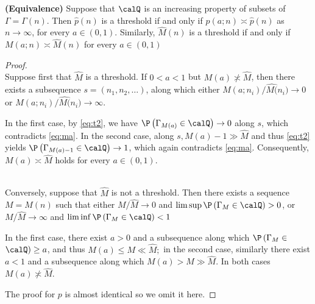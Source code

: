 \documentclass{article}
\newcommand{\bfs}[1]{\textbf{({#1}) }}
\begin{document}
\begin{thma}{\bfs{Equivalence}}\label{thma:equ}
 Suppose that $\calQ$ is an increasing property of subsets of $\Gamma=\Gamma(n) .$ Then $\widehat{p}(n)$ is a threshold if and only if $p(a ; n) \asymp \widehat{p}(n)$ as $n \rightarrow \infty$, for every $a \in(0,1) .$ Similarly, $\widehat{M}(n)$ is a threshold if and only if $M(a ; n) \asymp \widehat{M}(n)$ for every $a \in(0,1)$
\end{thma} 
\begin{proof}\quad

\\
Suppose first that $\widehat{M}$ is a threshold. If $0<a<1$ but $M(a) \not\asymp \widehat{M}$, then there exists a subsequence $s=\left(n_{1}, n_{2}, \ldots\right)$, along which either $M(a;n_i) / \widehat{M(}n_i) \rightarrow 0$
or $M(a;n_i) / \widehat{M(}n_i) \rightarrow \infty .$ 

In the first case, by \cref{eq:t2}, we have $\P \left(\Gamma_{M(a)} \in \calQ \right) \rightarrow 0$ along
$s$, which contradicts \cref{eq:ma}. In the second case, along $s, M(a)-1 \gg \widehat{M}$ and thus \cref{eq:t2} yields $\P \left(\Gamma_{M(a)-1} \in \calQ \right) \rightarrow 1$, which again contradicts \cref{eq:ma}. Consequently, $M(a) \asymp \widehat{M}$ holds for every $a \in(0,1)$.

\\
Conversely, suppose that $\widehat{M}$ is not a threshold. Then there exists a sequence $M=M(n)$ such that either $M / \widehat{M} \rightarrow 0$ and $\limsup \P \left(\Gamma_{M} \in \calQ \right)>0$, or
$M / \widehat{M} \rightarrow \infty$ and $\liminf \P \left(\Gamma_{M} \in \calQ \right)<1$


In the first case, there exist $a>0$ and a subsequence along which $\P \left(\Gamma_{M} \in\right.$ $\calQ ) \geq a$, and thus $M(a) \leq M \ll \widehat{M} ;$ in the second case, similarly there exist $a<1$ and a subsequence along which $M(a)>M \gg \widehat{M}$. In both cases $M(a) \not\asymp \widehat{M}$.

The proof for $p$ is almost identical so we omit it here.
\end{proof}
\end{document}
